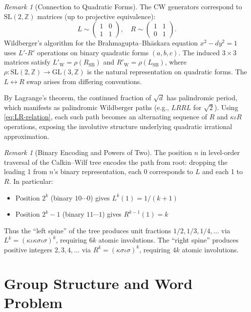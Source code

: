 \documentclass[11pt]{article}
\theoremstyle{plain}
\theoremstyle{definition}
\theoremstyle{remark}
\newtheorem{remark}[theorem]{Remark}
\begin{document}
\begin{remark}[Connection to Quadratic Forms]
The CW generators correspond to $\mathrm{SL}(2,\mathbb{Z})$ matrices
(up to projective equivalence):
\[
L \sim \begin{pmatrix} 1 & 0 \\ 1 & 1 \end{pmatrix}, \quad
R \sim \begin{pmatrix} 1 & 1 \\ 0 & 1 \end{pmatrix}.
\]
Wildberger's algorithm for the Brahmagupta--Bh\=askara equation $x^2 - dy^2 = 1$
uses $L'$-$R'$ operations on binary quadratic forms $(a,b,c)$.
The induced $3 \times 3$ matrices satisfy
$L'_{\text{W}} = \rho(R_{\text{SB}})$ and $R'_{\text{W}} = \rho(L_{\text{SB}})$,
where $\rho\colon \mathrm{SL}(2,\mathbb{Z}) \to \mathrm{GL}(3,\mathbb{Z})$
is the natural representation on quadratic forms.
The $L \leftrightarrow R$ swap arises from differing conventions.

By Lagrange's theorem, the continued fraction of $\sqrt{d}$ has palindromic period,
which manifests as palindromic Wildberger paths (e.g., $LRRL$ for $\sqrt{2}$).
Using \eqref{eq:LR-relation}, each such path becomes an alternating sequence
of $R$ and $\kappa\iota R$ operations, exposing the involutive structure
underlying quadratic irrational approximation.
\end{remark}

\begin{remark}[Binary Encoding and Powers of Two]
The position $n$ in level-order traversal of the Calkin--Wilf tree encodes
the path from root: dropping the leading 1 from $n$'s binary representation,
each 0 corresponds to $L$ and each 1 to $R$. In particular:
\begin{itemize}
\item Position $2^k$ (binary $10\cdots0$) gives $L^k(1) = 1/(k+1)$
\item Position $2^k-1$ (binary $11\cdots1$) gives $R^{k-1}(1) = k$
\end{itemize}
Thus the ``left spine'' of the tree produces unit fractions $1/2, 1/3, 1/4, \ldots$
via $L^k = (\kappa\iota\kappa\sigma\iota\sigma)^k$, requiring $6k$ atomic involutions.
The ``right spine'' produces positive integers $2, 3, 4, \ldots$ via
$R^k = (\kappa\sigma\iota\sigma)^k$, requiring $4k$ atomic involutions.
\end{remark}

\section{Group Structure and Word Problem}
\end{document}
